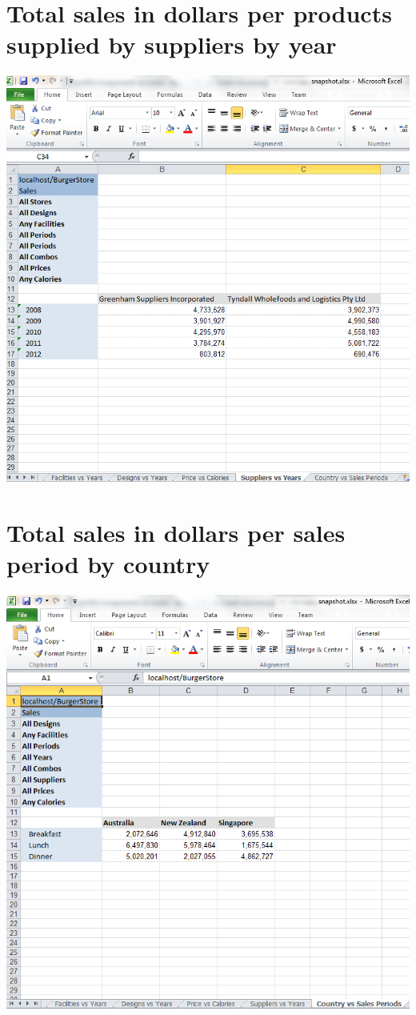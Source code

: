 \documentclass[12pt, a4paper]{article}
\begin{document}
\section{Total sales in dollars per products supplied by suppliers by year}
\includegraphics{diagrams/SuppliersVsYears}

\section{Total sales in dollars per sales period by country}
\includegraphics{diagrams/CountryVsSalesPeriod}
\end{document}
